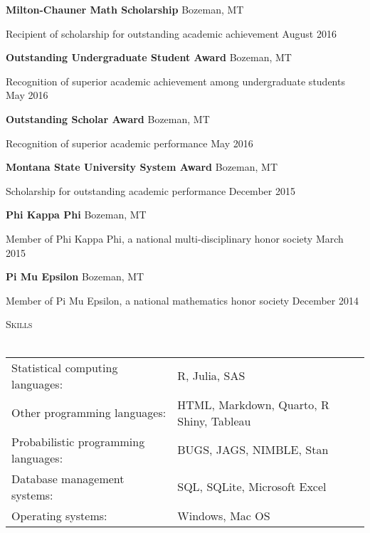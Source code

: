 \documentclass[a4paper]{article}
\newcommand{\lineunder} {
	\vspace*{-8pt} \\
	\hspace*{-18pt} \hrulefill \\
}
\newcommand{\header} [1] {
	{\hspace*{-18pt}\vspace*{6pt} \textsc{#1}}
	\vspace*{-6pt} \lineunder
}
\begin{document}
\vspace*{2mm}

\textbf{Milton-Chauner Math Scholarship} \hfill Bozeman, MT

Recipient of scholarship for outstanding academic achievement
\hfill August 2016

\vspace*{2mm}

\textbf{Outstanding Undergraduate Student Award} \hfill Bozeman, MT

Recognition of superior academic achievement among undergraduate
students \hfill May 2016

\vspace*{2mm}

\textbf{Outstanding Scholar Award} \hfill Bozeman, MT

Recognition of superior academic performance \hfill May 2016

\vspace*{2mm}

\textbf{Montana State University System Award} \hfill Bozeman, MT

Scholarship for outstanding academic performance \hfill December 2015

\vspace*{2mm}

\textbf{Phi Kappa Phi} \hfill Bozeman, MT

Member of Phi Kappa Phi, a national multi-disciplinary honor society
\hfill March 2015

\vspace*{2mm}

\textbf{Pi Mu Epsilon} \hfill Bozeman, MT

Member of Pi Mu Epsilon, a national mathematics honor society
\hfill December 2014

\vspace*{2mm}

\header{Skills}
\vspace*{2mm}
\begin{tabular}{ l l }
  Statistical computing languages:  & R, Julia, SAS \\
    Other programming languages:         &  HTML, Markdown, Quarto, R Shiny, Tableau \\
  Probabilistic programming languages:         & BUGS, JAGS, NIMBLE, Stan \\
    Database management systems:         & SQL, SQLite, Microsoft Excel \\
    Operating systems:       & Windows, Mac OS \\
\end{tabular}
\vspace*{2mm}
\end{document}
